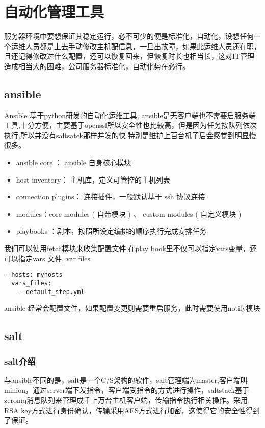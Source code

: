 \chapter{自动化管理工具}
服务器环境中要想保证其稳定运行，必不可少的便是标准化，自动化，设想任何一个运维人员都是上去手动修改主机配信息，一旦出故障，如果此运维人员还在职，且还记得修改过什么配置，还可以恢复回来，但恢复时长也相当长，这对IT管理造成相当大的困难，公司服务器标准化，自动化势在必行。
\section{ansible}
Ansible 基于python研发的自动化运维工具, ansible是无客户端也不需要启服务端工具,十分方便，主要基于openssl所以安全性也比较高，但是因为任务按队列依次执行,所以并没有saltsatck那样并发的快.特别是维护上百台机子后会感觉到明显慢很多。
\begin{itemize}
\item ansible core ： ansible 自身核心模块
\item host inventory： 主机库，定义可管控的主机列表
\item connection plugins： 连接插件，一般默认基于 ssh 协议连接
\item modules：core modules ( 自带模块 ) 、 custom modules ( 自定义模块 )
\item playbooks ：剧本，按照所设定编排的顺序执行完成安排任务
\end{itemize}
我们可以使用fetch模块来收集配置文件,在play book里不仅可以指定vars变量，还可以指定vars 文件, var files
\begin{lstlisting}
- hosts: myhosts
  vars_files:
    - default_step.yml
\end{lstlisting}

ansible 经常会配置文件，如果配置变更则需要重启服务，此时需要使用notify模块

\section{salt}

\subsection{salt介绍}
与ansible不同的是，salt是一个C/S架构的软件，salt管理端为master,客户端叫minion，通过server端下发指令，客户端受指令的方式进行操作，saltstack基于zeromq消息队列来管理成千上万台主机客户端，传输指令执行相关操作。采用RSA key方式进行身份确认，传输采用AES方式进行加密，这使得它的安全性得到了保证。


